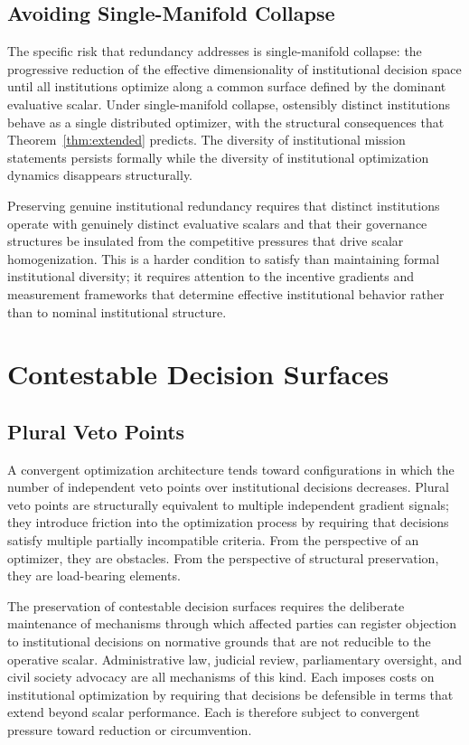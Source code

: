 \documentclass[12pt, oneside]{book}
\theoremstyle{plain}
\theoremstyle{definition}
\theoremstyle{remark}
\theoremstyle{definition}
\begin{document}
\section{Avoiding Single-Manifold Collapse}

The specific risk that redundancy addresses is single-manifold collapse: the
progressive reduction of the effective dimensionality of institutional decision
space until all institutions optimize along a common surface defined by the dominant
evaluative scalar. Under single-manifold collapse, ostensibly distinct institutions
behave as a single distributed optimizer, with the structural consequences that
Theorem~\ref{thm:extended} predicts. The diversity of institutional mission
statements persists formally while the diversity of institutional optimization
dynamics disappears structurally.

Preserving genuine institutional redundancy requires that distinct institutions
operate with genuinely distinct evaluative scalars and that their governance
structures be insulated from the competitive pressures that drive scalar
homogenization. This is a harder condition to satisfy than maintaining formal
institutional diversity; it requires attention to the incentive gradients and
measurement frameworks that determine effective institutional behavior rather than
to nominal institutional structure.

\chapter{Contestable Decision Surfaces}
\label{ch:contestable}

\section{Plural Veto Points}

A convergent optimization architecture tends toward configurations in which the
number of independent veto points over institutional decisions decreases. Plural
veto points are structurally equivalent to multiple independent gradient signals;
they introduce friction into the optimization process by requiring that decisions
satisfy multiple partially incompatible criteria. From the perspective of an
optimizer, they are obstacles. From the perspective of structural preservation,
they are load-bearing elements.

The preservation of contestable decision surfaces requires the deliberate maintenance
of mechanisms through which affected parties can register objection to institutional
decisions on normative grounds that are not reducible to the operative scalar.
Administrative law, judicial review, parliamentary oversight, and civil society
advocacy are all mechanisms of this kind. Each imposes costs on institutional
optimization by requiring that decisions be defensible in terms that extend beyond
scalar performance. Each is therefore subject to convergent pressure toward reduction
or circumvention.
\end{document}
